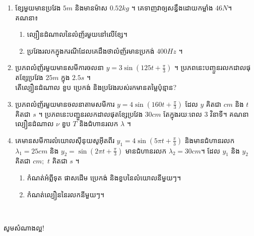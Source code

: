\documentclass{officialexam}
\begin{document}
\begin{enumerate}[m]
\begin{enumerate}[k]
	 	\end{enumerate}
	 	\item ខ្សែមួយមានប្រវែង $5m$ និងមានម៉ាស $0.52kg$ ។ គេទាញវាឲ្យសន្ធឹងដោយកម្លាំង $46N$។ គណនា៖
	 	\begin{enumerate}[k]
	 		\item ល្បឿនដំណាលនៃលំញ័រមួយនៅលើខ្សែ។
	 		\item ប្រវែងរលកក្នុងករណីដែលគេដឹងថាលំញ័រមានប្រកង់ $400Hz$ ។
	 	\end{enumerate}
 		\item ប្រភពលំញ័រមួយមានសមីការចលនា $y=3\sin\left(125t + \frac{\pi}{3}\right)$ ។ ប្រភពនេះបញ្ចួនរលកដាលផុតខ្សែប្រវែង $25m$ ក្នុង $2.5s$ ។\\ តើល្បឿនដំណាល ខួប ប្រេកង់ និងប្រវែងរបស់រកមានតម្លៃប៉ុន្មាន?
 		\item ប្រភពលំញ័រមួយមានចលនាតាមសមីការ $y=4\sin\left(160t+\frac{\pi}{3}\right)$ ដែល $y$ គិតជា $cm$ និង $t$ គិតជា $s$ ។
 		ប្រភពនេះបញ្ជួនរលកដាលផុតខ្សែប្រវែង $30cm$ តែក្នុងរយៈពេល $3$ វិនាទី។
 		គណនាល្បឿនដំណាល $\nu$ ខួប $T$ និងជំហានរលក $\lambda$ ។
 		\item គេមានសមីការលំយោលសុីនុយសូអុីតពីរ $y_1=4\sin\left(5\pi t + \frac{\pi}{3}\right)$ និងមានជំហានរលក $\lambda_1=25cm$ និង $y_2=\sin\left(2\pi t + \frac{\pi}{3}\right)$ មានជំហានរលក $\lambda_2=30cm$។ ដែល $y_1$ និង $y_2$ គិតជា $cm;$ $t$ គិតជា $s$ ។
 		\begin{enumerate}[k]
 			\item កំណត់អំព្លីទុត ផាសដើម ប្រេកង់ និងខួបនៃលំយោលនីមួយៗ។
 			\item កំណត់ល្បឿននៃរលកនីមួយៗ។
 		\end{enumerate}
	\end{enumerate}
\\
\begin{center}
	\sffamily\color{blue}
	សូមសំណាងល្អ!
\end{center}\newpage
{}
\end{document}
